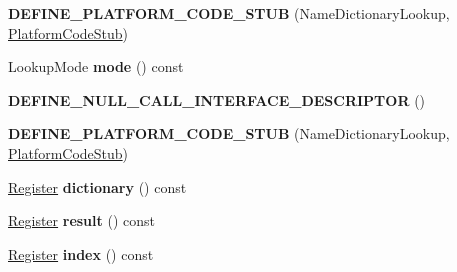 \begin{DoxyCompactItemize}
\item 
{\bfseries D\+E\+F\+I\+N\+E\+\_\+\+P\+L\+A\+T\+F\+O\+R\+M\+\_\+\+C\+O\+D\+E\+\_\+\+S\+T\+UB} (Name\+Dictionary\+Lookup, \hyperlink{classv8_1_1internal_1_1_platform_code_stub}{Platform\+Code\+Stub})\hypertarget{classv8_1_1internal_1_1_name_dictionary_lookup_stub_a9b6511fda10d2ab14ce9366da895bb71}{}\label{classv8_1_1internal_1_1_name_dictionary_lookup_stub_a9b6511fda10d2ab14ce9366da895bb71}

\item 
Lookup\+Mode {\bfseries mode} () const \hypertarget{classv8_1_1internal_1_1_name_dictionary_lookup_stub_ae1880a8b261f163f4d11a3d3809252ab}{}\label{classv8_1_1internal_1_1_name_dictionary_lookup_stub_ae1880a8b261f163f4d11a3d3809252ab}

\item 
{\bfseries D\+E\+F\+I\+N\+E\+\_\+\+N\+U\+L\+L\+\_\+\+C\+A\+L\+L\+\_\+\+I\+N\+T\+E\+R\+F\+A\+C\+E\+\_\+\+D\+E\+S\+C\+R\+I\+P\+T\+OR} ()\hypertarget{classv8_1_1internal_1_1_name_dictionary_lookup_stub_a56e72757ba3ab8928220e89075ca6848}{}\label{classv8_1_1internal_1_1_name_dictionary_lookup_stub_a56e72757ba3ab8928220e89075ca6848}

\item 
{\bfseries D\+E\+F\+I\+N\+E\+\_\+\+P\+L\+A\+T\+F\+O\+R\+M\+\_\+\+C\+O\+D\+E\+\_\+\+S\+T\+UB} (Name\+Dictionary\+Lookup, \hyperlink{classv8_1_1internal_1_1_platform_code_stub}{Platform\+Code\+Stub})\hypertarget{classv8_1_1internal_1_1_name_dictionary_lookup_stub_a9b6511fda10d2ab14ce9366da895bb71}{}\label{classv8_1_1internal_1_1_name_dictionary_lookup_stub_a9b6511fda10d2ab14ce9366da895bb71}

\item 
\hyperlink{structv8_1_1internal_1_1_register}{Register} {\bfseries dictionary} () const \hypertarget{classv8_1_1internal_1_1_name_dictionary_lookup_stub_ac861b8263ad2fe6df68e0e9d6fb8b3b7}{}\label{classv8_1_1internal_1_1_name_dictionary_lookup_stub_ac861b8263ad2fe6df68e0e9d6fb8b3b7}

\item 
\hyperlink{structv8_1_1internal_1_1_register}{Register} {\bfseries result} () const \hypertarget{classv8_1_1internal_1_1_name_dictionary_lookup_stub_a2a5e0dc2f0d9b217467de313058274ba}{}\label{classv8_1_1internal_1_1_name_dictionary_lookup_stub_a2a5e0dc2f0d9b217467de313058274ba}

\item 
\hyperlink{structv8_1_1internal_1_1_register}{Register} {\bfseries index} () const \hypertarget{classv8_1_1internal_1_1_name_dictionary_lookup_stub_a09f710557ee64050dd1afb300391839d}{}\label{classv8_1_1internal_1_1_name_dictionary_lookup_stub_a09f710557ee64050dd1afb300391839d}


\end{DoxyCompactItemize}
